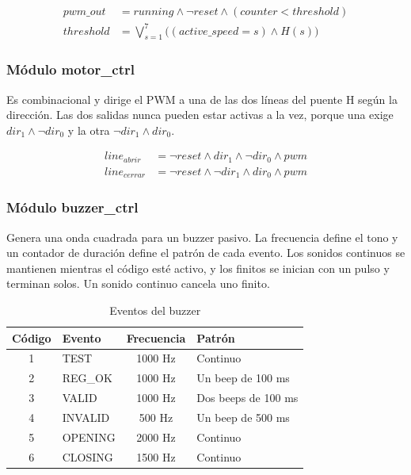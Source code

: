 \documentclass[11pt,letterpaper]{article}
\begin{document}
\begin{align*}
pwm\_out &= running \land \lnot reset \land (counter < threshold) \\
threshold &= \textstyle\bigvee_{s=1}^{7} \big( (active\_speed = s) \land H(s) \big)
\end{align*}

\subsubsection*{Módulo motor\_ctrl}

Es combinacional y dirige el PWM a una de las dos líneas del puente H según la dirección. Las dos salidas nunca pueden estar activas a la vez, porque una exige $dir_1 \land \lnot dir_0$ y la otra $\lnot dir_1 \land dir_0$.

\begin{align*}
line_{abrir} &= \lnot reset \land dir_1 \land \lnot dir_0 \land pwm \\
line_{cerrar} &= \lnot reset \land \lnot dir_1 \land dir_0 \land pwm
\end{align*}

\subsubsection*{Módulo buzzer\_ctrl}

Genera una onda cuadrada para un buzzer pasivo. La frecuencia define el tono y un contador de duración define el patrón de cada evento. Los sonidos continuos se mantienen mientras el código esté activo, y los finitos se inician con un pulso y terminan solos. Un sonido continuo cancela uno finito.

\begin{table}[H]
\centering
\small
\caption{Eventos del buzzer}
\begin{tabular}{c l c l}
\toprule
\textbf{Código} & \textbf{Evento} & \textbf{Frecuencia} & \textbf{Patrón} \\
\midrule
1 & TEST & 1000 Hz & Continuo \\
2 & REG\_OK & 1000 Hz & Un beep de 100 ms \\
3 & VALID & 1000 Hz & Dos beeps de 100 ms \\
4 & INVALID & 500 Hz & Un beep de 500 ms \\
5 & OPENING & 2000 Hz & Continuo \\
6 & CLOSING & 1500 Hz & Continuo \\
\bottomrule
\end{tabular}
\end{table}
\end{document}
